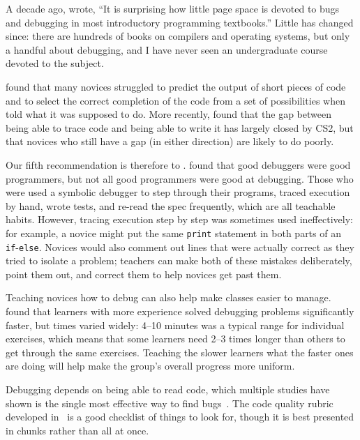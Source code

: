 
A decade ago,
\cite{McCa2008} wrote,
``It is surprising how little page space is devoted to bugs and debugging
in most introductory programming textbooks.''
Little has changed since:
there are hundreds of books on compilers and operating systems,
but only a handful about debugging,
and I have never seen an undergraduate course devoted to the subject.

\cite{List2004,List2009} found that many novices struggled to predict the output of short pieces of code
and to select the correct completion of the code from a set of possibilities
when told what it was supposed to do.
More recently,
\cite{Harr2018} found that the gap between being able to trace code and being able to write it has largely closed by CS2,
but that novices who still have a gap (in either direction) are likely to do poorly.

Our fifth recommendation is therefore to .
\cite{Fitz2008,Murp2008} found that good debuggers were good programmers,
but not all good programmers were good at debugging.
Those who were used a symbolic debugger to step through their programs,
traced execution by hand,
wrote tests,
and re-read the spec frequently,
which are all teachable habits.
However,
tracing execution step by step was sometimes used ineffectively:
for example,
a novice might put the same \texttt{print} statement in both parts of an \texttt{if}-\texttt{else}.
Novices would also comment out lines that were actually correct as they tried to isolate a problem;
teachers can make both of these mistakes deliberately,
point them out,
and correct them to help novices get past them.

Teaching novices how to debug can also help make classes easier to manage.
\cite{Alqa2017} found that learners with more experience solved debugging problems significantly faster,
but times varied widely:
4--10 minutes was a typical range for individual exercises,
which means that some learners need 2--3 times longer than others to get through the same exercises.
Teaching the slower learners what the faster ones are doing
will help make the group's overall progress more uniform.

Debugging depends on being able to read code,
which multiple studies have shown is the single most effective way to find bugs~\cite{Basi1987,Keme2009,Bacc2013}.
The code quality rubric developed in~\cite{Steg2014,Steg2016a}
is a good checklist of things to look for,
though it is best presented in chunks rather than all at once.


